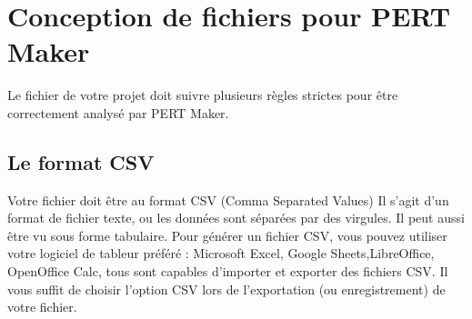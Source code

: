 \documentclass{article}
\begin{document}
\section{Conception de fichiers pour PERT Maker}
Le fichier de votre projet doit suivre plusieurs règles strictes pour être correctement analysé par PERT Maker.

\subsection{Le format CSV}
Votre fichier doit être au format CSV (Comma Separated Values)
Il s'agit d'un format de fichier texte, ou les données sont séparées par des virgules.
Il peut aussi être vu sous forme tabulaire.
Pour générer un fichier CSV, vous pouvez utiliser votre logiciel de tableur préféré :
Microsoft Excel, Google Sheets,LibreOffice, OpenOffice Calc, tous sont capables d'importer
et exporter des fichiers CSV.
Il vous suffit de choisir l'option CSV lors de l'exportation (ou enregistrement) de votre fichier.
\end{document}
